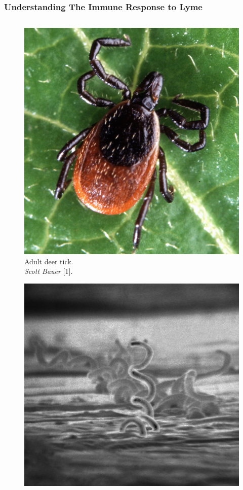 \documentclass[usenames,dvipsnames,15pt]{beamer}
\begin{document}
\begin{frame}
  \frametitle{Understanding The Immune Response to Lyme}
  \begin{columns}
    \begin{column}{.25\textwidth}
      \begin{figure}
        \vspace{-.5cm}
        \includegraphics[scale=.35]{pictures/tick.jpg}\\
        {\tiny Adult deer tick.\\\vspace{-.2cm}\emph{Scott Bauer} [1].}
      \end{figure}\vspace{-1.25cm}
      \begin{figure}
        \includegraphics[scale=1.4]{pictures/spiro.jpg}\\

\end{figure}
\end{column}
\end{columns}
\end{frame}
\end{document}
